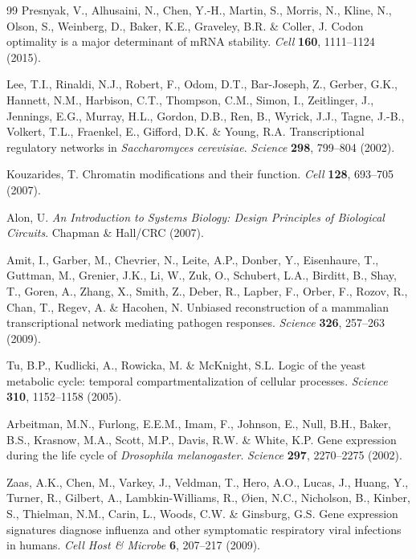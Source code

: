 \documentclass[11pt,letterpaper]{article}
\begin{document}
\begin{thebibliography}{99}
Presnyak, V., Alhusaini, N., Chen, Y.-H., Martin, S., Morris, N., Kline, N., Olson, S., Weinberg, D., Baker, K.E., Graveley, B.R. \& Coller, J.
Codon optimality is a major determinant of mRNA stability.
\textit{Cell} \textbf{160}, 1111--1124 (2015).

Lee, T.I., Rinaldi, N.J., Robert, F., Odom, D.T., Bar-Joseph, Z., Gerber, G.K., Hannett, N.M., Harbison, C.T., Thompson, C.M., Simon, I., Zeitlinger, J., Jennings, E.G., Murray, H.L., Gordon, D.B., Ren, B., Wyrick, J.J., Tagne, J.-B., Volkert, T.L., Fraenkel, E., Gifford, D.K. \& Young, R.A.
Transcriptional regulatory networks in \textit{Saccharomyces cerevisiae}.
\textit{Science} \textbf{298}, 799--804 (2002).

Kouzarides, T.
Chromatin modifications and their function.
\textit{Cell} \textbf{128}, 693--705 (2007).

Alon, U.
\textit{An Introduction to Systems Biology: Design Principles of Biological Circuits}.
Chapman \& Hall/CRC (2007).

Amit, I., Garber, M., Chevrier, N., Leite, A.P., Donber, Y., Eisenhaure, T., Guttman, M., Grenier, J.K., Li, W., Zuk, O., Schubert, L.A., Birditt, B., Shay, T., Goren, A., Zhang, X., Smith, Z., Deber, R., Lapber, F., Orber, F., Rozov, R., Chan, T., Regev, A. \& Hacohen, N.
Unbiased reconstruction of a mammalian transcriptional network mediating pathogen responses.
\textit{Science} \textbf{326}, 257--263 (2009).

Tu, B.P., Kudlicki, A., Rowicka, M. \& McKnight, S.L.
Logic of the yeast metabolic cycle: temporal compartmentalization of cellular processes.
\textit{Science} \textbf{310}, 1152--1158 (2005).

Arbeitman, M.N., Furlong, E.E.M., Imam, F., Johnson, E., Null, B.H., Baker, B.S., Krasnow, M.A., Scott, M.P., Davis, R.W. \& White, K.P.
Gene expression during the life cycle of \textit{Drosophila melanogaster}.
\textit{Science} \textbf{297}, 2270--2275 (2002).

Zaas, A.K., Chen, M., Varkey, J., Veldman, T., Hero, A.O., Lucas, J., Huang, Y., Turner, R., Gilbert, A., Lambkin-Williams, R., \O{}ien, N.C., Nicholson, B., Kinber, S., Thielman, N.M., Carin, L., Woods, C.W. \& Ginsburg, G.S.
Gene expression signatures diagnose influenza and other symptomatic respiratory viral infections in humans.
\textit{Cell Host \& Microbe} \textbf{6}, 207--217 (2009).


\end{thebibliography}
\end{document}
